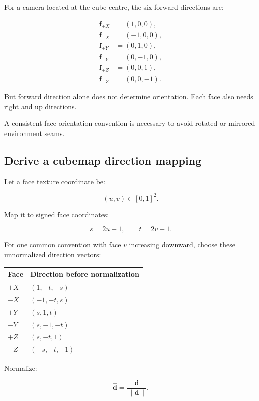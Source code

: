 For a camera located at the cube centre, the six forward directions are:

\[ \begin{aligned} \mathbf f_{+X}&=(1,0,0),\\ \mathbf f_{-X}&=(-1,0,0),\\ \mathbf f_{+Y}&=(0,1,0),\\ \mathbf f_{-Y}&=(0,-1,0),\\ \mathbf f_{+Z}&=(0,0,1),\\ \mathbf f_{-Z}&=(0,0,-1). \end{aligned} \]

But forward direction alone does not determine orientation. Each face also needs right and up directions.

A consistent face-orientation convention is necessary to avoid rotated or mirrored environment seams.

\subsection{Derive a cubemap direction mapping}\label{02-foundations-ii-ch035-derive-a-cubemap-direction-mapping}

Let a face texture coordinate be:

\[ (u,v)\in[0,1]^2. \]

Map it to signed face coordinates:

\[ s=2u-1, \qquad t=2v-1. \]

For one common convention with face \(v\) increasing downward, choose these unnormalized direction vectors:

{\def\LTcaptype{none} %
\begin{longtable}[]{@{}ll@{}}
\toprule\noalign{}
Face & Direction before normalization \\
\midrule\noalign{}
\endhead
\bottomrule\noalign{}
\endlastfoot
\(+X\) & \((1,-t,-s)\) \\
\(-X\) & \((-1,-t,s)\) \\
\(+Y\) & \((s,1,t)\) \\
\(-Y\) & \((s,-1,-t)\) \\
\(+Z\) & \((s,-t,1)\) \\
\(-Z\) & \((-s,-t,-1)\) \\
\end{longtable}
}

Normalize:

\[ \boxed{ \hat{\mathbf d}= \frac{\mathbf d}{\|\mathbf d\|}. } \]

